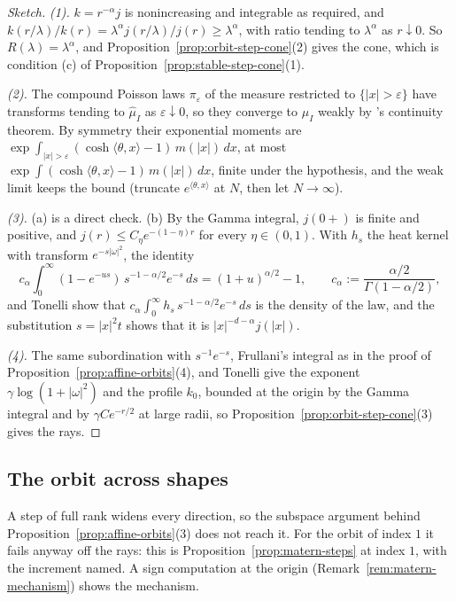 \begin{proof}[Sketch]
\emph{(1).} $k = r^{-\alpha}j$ is nonincreasing and integrable as required, and
$k(r/\lambda)/k(r) = \lambda^\alpha j(r/\lambda)/j(r) \ge \lambda^\alpha$, with ratio tending to
$\lambda^\alpha$ as $r \downarrow 0$. So $R(\lambda) = \lambda^\alpha$, and
Proposition~\ref{prop:orbit-step-cone}(2) gives the cone, which is condition (c) of
Proposition~\ref{prop:stable-step-cone}(1).

\emph{(2).} The compound Poisson laws $\pi_\varepsilon$ of the \Levy{} measure restricted to
$\{|x| > \varepsilon\}$ have transforms tending to $\widehat\mu_I$ as $\varepsilon \downarrow 0$, so they
converge to $\mu_I$ weakly by \Levy{}'s continuity theorem. By symmetry their exponential moments are
$\exp\int_{|x|>\varepsilon}(\cosh\langle\theta,x\rangle - 1)\,m(|x|)\,dx$, at most
$\exp\int(\cosh\langle\theta,x\rangle - 1)\,m(|x|)\,dx$, finite under the hypothesis, and the weak limit
keeps the bound (truncate $e^{\langle\theta,x\rangle}$ at $N$, then let $N \to \infty$).

\emph{(3).} (a) is a direct check. (b) By the Gamma integral, $j(0{+})$ is finite and positive, and
$j(r) \le C_\eta e^{-(1-\eta)r}$ for every $\eta \in (0,1)$. With $h_s$ the heat kernel with transform
$e^{-s|\omega|^2}$, the identity
\[
  c_\alpha\int_0^\infty(1 - e^{-us})\,s^{-1-\alpha/2}e^{-s}\,ds = (1+u)^{\alpha/2} - 1 ,
  \qquad c_\alpha := \frac{\alpha/2}{\Gamma(1-\alpha/2)},
\]
and Tonelli show that $c_\alpha\int_0^\infty h_s\,s^{-1-\alpha/2}e^{-s}\,ds$ is the \Levy{} density of the
law, and the substitution $s = |x|^2t$ shows that it is $|x|^{-d-\alpha}j(|x|)$.

\emph{(4).} The same subordination with $s^{-1}e^{-s}$, Frullani's integral as in the proof of
Proposition~\ref{prop:affine-orbits}(4), and Tonelli give the exponent $\gamma\log(1 + |\omega|^2)$ and
the profile $k_0$, bounded at the origin by the Gamma integral and by $\gamma Ce^{-r/2}$ at large
radii, so Proposition~\ref{prop:orbit-step-cone}(3) gives the rays.
\end{proof}

\subsection{The \texorpdfstring{\Matern{}}{Matern} orbit across shapes}\label{app:matern}

A step of full rank widens every direction, so the subspace argument behind
Proposition~\ref{prop:affine-orbits}(3) does not reach it. For the \Matern{} orbit of index $1$ it fails
anyway off the rays: this is Proposition~\ref{prop:matern-steps} at index $1$, with the increment
named. A sign computation at the origin (Remark~\ref{rem:matern-mechanism}) shows the mechanism.

